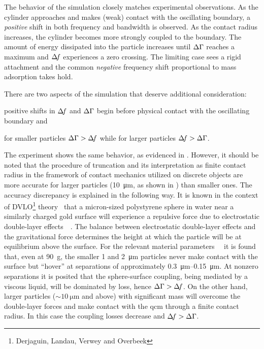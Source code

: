 The behavior of the simulation closely matches
experimental observations.  As the cylinder approaches and makes (weak)
contact with the oscillating boundary, a \textit{positive} shift in both
frequency and bandwidth is observed.  As the contact radius increases, the
cylinder becomes more strongly coupled to the boundary. The amount of energy
dissipated into the particle increases until $\Delta\Gamma$ reaches a maximum and
$\Delta\!f$ experiences a zero crossing.  The limiting case sees a rigid
attachment and the common \textit{negative} frequency shift proportional to
mass adsorption takes hold.

There are two aspects of the simulation that deserve additional
consideration:%
\begin{inparaenum}[(1)]
\item positive shifts in $\Delta\!f$ and $\Delta\Gamma$ begin
before physical contact with the oscillating boundary and
\item for smaller particles $\Delta\Gamma>\Delta\!f$ while for
larger particles $\Delta\!f>\Delta\Gamma$.
\end{inparaenum}

The experiment shows the same behavior, as evidenced in
.  However, it should be noted that the procedure of
truncation and its interpretation as finite contact radius in the framework
of contact mechanics utilized on discrete objects are more accurate for
larger particles (\SI{10}{\micro\meter}, as shown in
) than smaller ones.  The accuracy discrepancy is
explained in the following way.  It is known in the context of
DVLO\footnote{Derjaguin, Landau, Verwey and Overbeek}
theory~\cite{israelachvili2011intermolecular} that a micron-sized
polystyrene sphere in water near a similarly charged gold surface will
experience a repulsive force due to electrostatic double-layer
effects~\cite{alexander1987hydrodynamic}~\cite{flicker1993quantifying}.
The balance between electrostatic double-layer effects and the
gravitational force determines the height at which the particle will be at
equilibrium above the surface.  For the relevant material
parameters~\cite{israelachvili2011intermolecular}~\cite{sharma1992factors}
it is found that, even at \SI{90}{g}, the smaller \num{1} and
\SI{2}{\micro\meter} particles never make contact with the surface but
``hover'' at separations of approximately
\SIrange{0.3}{0.15}{\micro\meter}.  At nonzero separations it is posited
that the sphere-surface coupling, being mediated by a viscous liquid, will
be dominated by loss, hence $\Delta\Gamma>\Delta\!f$.  On the other hand, larger particles
($\sim\SI{10}{\micro\meter}$ and above) with significant mass will overcome
the double-layer forces and make contact with the \gls{qcm} through a finite
contact radius.  In this case the coupling losses decrease and $\Delta\!f>\Delta\Gamma$.

